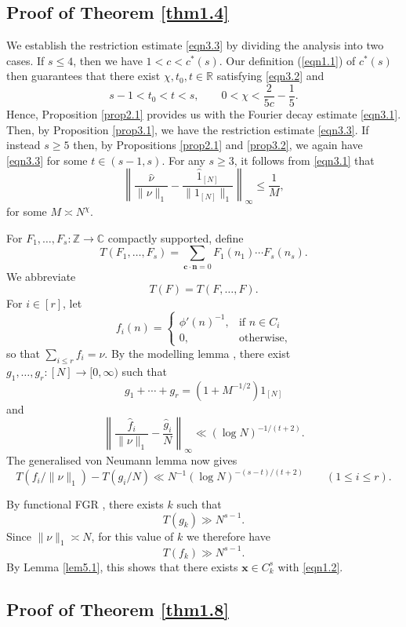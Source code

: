 \documentclass[12pt, reqno]{amsart}
\theoremstyle{definition}
\theoremstyle{remark}
\numberwithin{equation}{section}
\theoremstyle{definition}
\def\le{\leqslant} \def\ge{\geqslant} \def\pleq{\preccurlyeq} \def\ple{\prec}
\def \bC {\mathbb C}
\def \bR {\mathbb R}
\def \bZ {\mathbb Z}
\def \bc {\mathbf c}
\def \bn {{\mathbf{n}}}
\def \bx {\mathbf x}
\begin{document}
\subsection{Proof of Theorem \ref{thm1.4}}

We establish the restriction estimate \eqref{eqn3.3} by dividing the analysis into two cases. If $s \le 4$, then we have $1 < c < c^*(s)$. Our definition (\ref{eqn1.1}) of $c^*(s)$ then guarantees that there exist $\chi, t_0, t \in \bR$ satisfying \eqref{eqn3.2} and
\[
s - 1 < t_0 < t < s, \qquad
0 < \chi < \frac{2}{5c} - \frac15.
\]
Hence, Proposition \ref{prop2.1} provides us with the Fourier decay estimate \eqref{eqn3.1}. Then, by Proposition \ref{prop3.1}, we have the restriction estimate \eqref{eqn3.3}. 
If instead $s \ge 5$ then, by Propositions \ref{prop2.1} and \ref{prop3.2}, we again have \eqref{eqn3.3} for some $t \in (s-1,s)$. 
For any $s \ge 3$, it follows from \eqref{eqn3.1} that
\[
\left\| \frac{\hat \nu}{\| \nu \|_1} - \frac{\hat{1}_{[N]}}{\| 1_{[N]} \|_1} \right \|_\infty \le \frac1M,
\]
for some $M \asymp N^\chi$.

For $F_1, \ldots, F_s: \bZ \to \bC$ compactly supported, define
\[
T(F_1, \ldots, F_s) = \sum_{\bc \cdot \bn = 0} F_1(n_1) \cdots F_s(n_s). 
\]
We abbreviate
\[
T(F) = T(F,\ldots,F).
\]
For $i \in [r]$, let
\[
f_i(n) = \begin{cases}
\phi'(n)^{-1}, &\text{if } n \in C_i \\
0, &\text{otherwise},
\end{cases}
\]
so that $\sum_{i \le r} f_i = \nu$. By the modelling lemma \cite[Proposition 14.1]{CLP2021}, there exist $g_1, \ldots, g_r: [N] \to [0, \infty)$ such that 
\[
g_1 + \cdots + g_r = (1 + M^{-1/2}) 1_{[N]}
\]
and
\[
\left \| \frac{\hat f_i}{\| \nu \|_1}
- \frac{\hat g_i}{N} \right \|_\infty \ll (\log N)^{-1/(t+2)}.
\]
The generalised von Neumann lemma \cite[Lemma C.3]{CLP2021} now gives
\[
T(f_i/\|\nu\|_1) - T(g_i/N)
\ll N^{-1} (\log N)^{-(s-t)/(t+2)} \qquad (1 \le i \le r).
\]

By functional FGR \cite[Lemma 15.2]{CLP2021}, there exists $k$ such that
\[
T(g_k) \gg N^{s-1}.
\]
Since $\| \nu \|_1 \asymp N$, for this value of $k$ we therefore have
\[
T(f_k) \gg N^{s-1}.
\]
By Lemma \ref{lem5.1}, this shows that there exists $\bx \in C_k^s$ with \eqref{eqn1.2}.

\subsection{Proof of Theorem \ref{thm1.8}}
\end{document}
